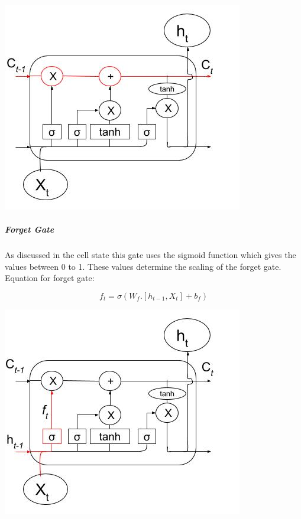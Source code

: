 				\begin{center}
				\includegraphics[width=\linewidth]{figures/Cell-State.jpg}	
				\label{fig: Cell State}
				\end{center}

\subparagraph{Forget Gate}

As discussed in the cell state this gate uses the sigmoid function which gives the values between 0 to 1. These values determine the scaling of the forget gate.
Equation for forget gate:

\begin{equation}
	f_{t} = \sigma (W_{f} . [h_{t-1}, X_{t}] + b_{f})	
\end{equation}

				\begin{center}
				\includegraphics[width=\linewidth]{figures/Forget-gate.jpg}	
				\label{fig: Forget Gate}
				\end{center}


